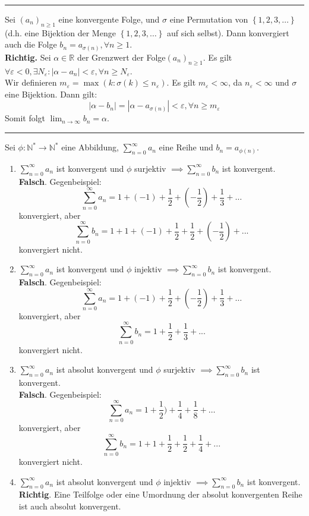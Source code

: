 \documentclass[a4paper,fontsize = 7pt]{scrartcl}
\def\limn{\lim_{n\to \infty}}
\def\sumn{\sum_{n=0}^\infty}
\def\R{\mathbb{R}}
\def\N{\mathbb{N}}
\begin{document}
\vspace{0.1 cm}
\hrule
\vspace{0.2 cm}

Sei $(a_n)_{n \geq 1}$ eine konvergente Folge, und $\sigma$ eine Permutation von $\left\{1, 2, 3, \dots \right\}$
(d.h. eine Bijektion der Menge $\left\{1, 2, 3, \dots \right\}$ auf sich selbst). Dann konvergiert auch die Folge $b_n = a_{\sigma(n)}, \forall n \geq 1$.
\\ 
\textbf{Richtig.} Sei $\alpha \in \R$ der Grenzwert der Folge$(a_n)_{n \geq 1}$. Es gilt $\forall \varepsilon < 0, \exists N_\varepsilon: |\alpha - a_n| < \varepsilon, \forall n \geq N_\varepsilon$.
\\ Wir definieren $m_\varepsilon = \max ({k: \sigma(k) \leq n_\varepsilon})$. Es gilt $m_\varepsilon < \infty$, da $n_\varepsilon < \infty$ und $\sigma$ eine Bijektion. Dann gilt:
$$|\alpha - b_n| = |\alpha - a_{\sigma(n)}| < \varepsilon, \forall n \geq m_\varepsilon$$
Somit folgt $\limn b_n = \alpha$.

\vspace{0.1 cm}
\hrule
\vspace{0.2 cm}

  Sei $\phi: \N^* \to \N^*$ eine Abbildung, $\sumn a_n$ eine Reihe und $b_n = a_{\phi(n)}$.
  \begin{enumerate}
    \item $\sumn a_n$ ist konvergent und $\phi$ surjektiv $\implies \sumn b_n$ ist konvergent.
    \\\textbf{Falsch}. Gegenbeispiel:
     $$\sumn a_n = 1 + \left(-1\right) + \frac{1}{2} + \left(-\frac{1}{2}\right) + \frac{1}{3} + \dots$$
     konvergiert, aber
     $$\sumn b_n = 1 + 1 + \left(-1\right) + \frac{1}{2} + \frac{1}{2} + \left(-\frac{1}{2}\right) + ...$$
     konvergiert nicht.
    \item $\sumn a_n$ ist konvergent und $\phi$ injektiv $\implies \sumn b_n$ ist konvergent.
    \\\textbf{Falsch}. Gegenbeispiel:
     $$\sumn a_n = 1 + \left(-1\right) + \frac{1}{2} + \left(-\frac{1}{2}\right) + \frac{1}{3} + \dots$$
     konvergiert, aber
     $$\sumn b_n = 1 + \frac{1}{2} + \frac{1}{3} + ...$$
     konvergiert nicht.
     \item $\sumn a_n$ ist absolut konvergent und $\phi$ surjektiv $\implies \sumn b_n$ ist konvergent.
     \\\textbf{Falsch}. Gegenbeispiel:
      $$\sumn a_n = 1 + \frac{1}{2} ) + \frac{1}{4} + \frac{1}{8} + \dots$$
      konvergiert, aber
      $$\sumn b_n = 1 + 1 + \frac{1}{2} + \frac{1}{2} + \frac{1}{4} + ...$$
      konvergiert nicht.
      \item $\sumn a_n$ ist absolut konvergent und $\phi$ injektiv $\implies \sumn b_n$ ist konvergent.
     \\\textbf{Richtig}. Eine Teilfolge oder eine Umordnung der absolut konvergenten Reihe ist auch absolut konvergent.
  \end{enumerate}
\end{document}
